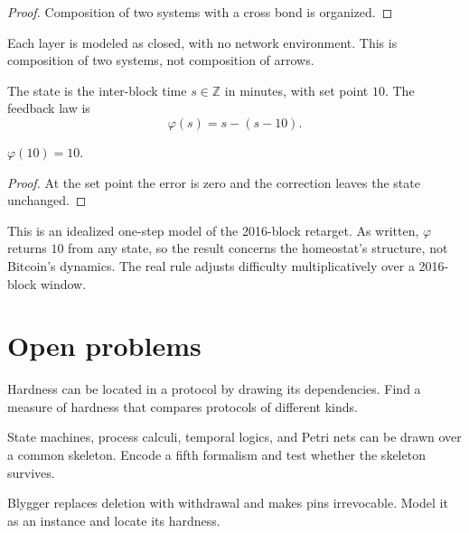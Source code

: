 \begin{proof}
  \leanok
  Composition of two systems with a cross bond is organized.
\end{proof}

\begin{remark}
  Each layer is modeled as closed, with no network environment. This is
  composition of two systems, not composition of arrows.
\end{remark}

\begin{definition}
  \label{def:homeostat}
  \leanok
  The state is the inter-block time $s \in \mathbb{Z}$ in minutes, with set
  point $10$. The feedback law is
  \[
    \varphi(s) = s - (s - 10).
  \]
\end{definition}

\begin{theorem}
  \label{thm:bitcoin}
  \leanok
  $\varphi(10) = 10$.
\end{theorem}

\begin{proof}
  \leanok
  At the set point the error is zero and the correction leaves the state
  unchanged.
\end{proof}

\begin{remark}
  This is an idealized one-step model of the 2016-block retarget. As written,
  $\varphi$ returns $10$ from any state, so the result concerns the
  homeostat's structure, not Bitcoin's dynamics. The real rule adjusts
  difficulty multiplicatively over a 2016-block window.
\end{remark}

\chapter{Open problems}

\begin{problem}
  \label{prob:hardness}
  Hardness can be located in a protocol by drawing its dependencies. Find a
  measure of hardness that compares protocols of different kinds.
\end{problem}

\begin{problem}
  \label{prob:fifth-formalism}
  State machines, process calculi, temporal logics, and Petri nets can be
  drawn over a common skeleton. Encode a fifth formalism and test whether the
  skeleton survives.
\end{problem}

\begin{problem}
  \label{prob:blygger}
  Blygger replaces deletion with withdrawal and makes pins irrevocable. Model
  it as an instance and locate its hardness.
\end{problem}
